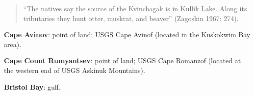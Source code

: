 \begin{hang}
\begin{quote}“The natives say the source of the Kvinchagak is in Kullik Lake. Along its tributaries they hunt otter, muskrat, and beaver” (Zagoskin 1967: 274).
 \end{quote}





\textbf{Cape Avinov}: point of land; USGS Cape Avinof (located in the Kuskokwim Bay area).



\textbf{Cape Count Rumyantsev}: point of land; USGS Cape Romanzof (located at the western end of USGS Askinuk Mountains).



\textbf{Bristol Bay}: gulf.

\end{hang}

